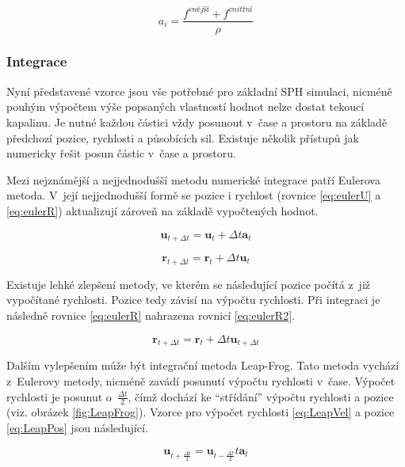 \begin{equation}
	a_i = \frac{f^{\textit{vnější}} + f^{\textit{vnitřní}}}{\rho}
	\label{eq:Acc}
\end{equation}

\subsubsection{Integrace}
Nyní představené vzorce jsou vše potřebné pro základní SPH simulaci, nicméně pouhým výpočtem výše popsaných vlastností hodnot nelze dostat tekoucí kapalinu. Je nutné každou částici vždy posunout v~čase a prostoru na základě předchozí pozice, rychlosti a působících sil. Existuje několik přístupů jak numericky řešit posun částic v~čase a prostoru.

Mezi nejznámější a nejjednodušší metodu numerické integrace patří Eulerova metoda. V~její nejjednodušší formě se pozice i rychlost (rovnice \ref{eq:eulerU} a \ref{eq:eulerR}) aktualizují zároveň na základě vypočtených hodnot.

\begin{equation}
	\mathbf{u}_{t + \Delta t} = \mathbf{u}_t + \Delta t \mathbf{a}_t
	\label{eq:eulerU}
\end{equation}

\begin{equation}
	\mathbf{r}_{t + \Delta t} = \mathbf{r}_t + \Delta t \mathbf{u}_t
	\label{eq:eulerR}
\end{equation}

Existuje lehké zlepšení metody, ve kterém se následující pozice počítá z~již vypočítané rychlosti. Pozice tedy závisí na výpočtu rychlosti. Při integraci je následně rovnice \ref{eq:eulerR} nahrazena rovnicí \ref{eq:eulerR2}. \cite{KelagerSPH}

\begin{equation}
	\mathbf{r}_{t + \Delta t} = \mathbf{r}_t + \Delta t \mathbf{u}_{t + \Delta t}
	\label{eq:eulerR2}
\end{equation}

Dalším vylepšením může být integrační metoda Leap-Frog. Tato metoda vychází z~Eulerovy metody, nicméně zavádí posunutí výpočtu rychlosti v~čase. Výpočet rychlosti je posunut o~$\frac{\Delta t}{2}$, čímž dochází ke \enquote{střídání} výpočtu rychlosti a pozice (viz. obrázek \ref{fig:LeapFrog}). Vzorce pro výpočet rychlosti \ref{eq:LeapVel} a pozice \ref{eq:LeapPos} jsou následující.

\begin{equation}
	\mathbf{u}_{t + \frac{\Delta t}{2}} = \mathbf{u}_{t - \frac{\Delta t}{2}} t \mathbf{a}_t
	\label{eq:LeapVel}
\end{equation}

